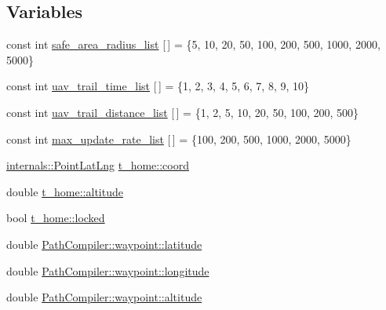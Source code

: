 \subsection*{\-Variables}
\begin{DoxyCompactItemize}
\item 
const int \hyperlink{group___o_p_map_plugin_ga508cdf04246e0731ce2b58e5d72844d6}{safe\-\_\-area\-\_\-radius\-\_\-list} \mbox{[}$\,$\mbox{]} = \{5, 10, 20, 50, 100, 200, 500, 1000, 2000, 5000\}
\item 
const int \hyperlink{group___o_p_map_plugin_ga42a1c15ba77f6bec7efc5e15cc2d7a6b}{uav\-\_\-trail\-\_\-time\-\_\-list} \mbox{[}$\,$\mbox{]} = \{1, 2, 3, 4, 5, 6, 7, 8, 9, 10\}
\item 
const int \hyperlink{group___o_p_map_plugin_ga8974b27951316cb97856a384f680d85e}{uav\-\_\-trail\-\_\-distance\-\_\-list} \mbox{[}$\,$\mbox{]} = \{1, 2, 5, 10, 20, 50, 100, 200, 500\}
\item 
const int \hyperlink{group___o_p_map_plugin_ga924197d237c4236b05e045cf5b299e51}{max\-\_\-update\-\_\-rate\-\_\-list} \mbox{[}$\,$\mbox{]} = \{100, 200, 500, 1000, 2000, 5000\}
\item 
\hyperlink{structinternals_1_1_point_lat_lng}{internals\-::\-Point\-Lat\-Lng} \hyperlink{group___o_p_map_plugin_ga6324b0912396582281b54bc6d5a6f38a}{t\-\_\-home\-::coord}
\item 
double \hyperlink{group___o_p_map_plugin_ga14ce78cb516fe7a0e7f20e423e92d538}{t\-\_\-home\-::altitude}
\item 
bool \hyperlink{group___o_p_map_plugin_ga4cc9a1ca8d219f1aa6d823fab6080f02}{t\-\_\-home\-::locked}
\item 
double \hyperlink{group___o_p_map_plugin_ga78f3936ec843f0060648b9503702acd6}{\-Path\-Compiler\-::waypoint\-::latitude}
\item 
double \hyperlink{group___o_p_map_plugin_ga698954b834d77d2eb539e287bc6bc9e0}{\-Path\-Compiler\-::waypoint\-::longitude}
\item 
double \hyperlink{group___o_p_map_plugin_ga538be1c7d40ec1ac89c5faad4012154e}{\-Path\-Compiler\-::waypoint\-::altitude}
\end{DoxyCompactItemize}
